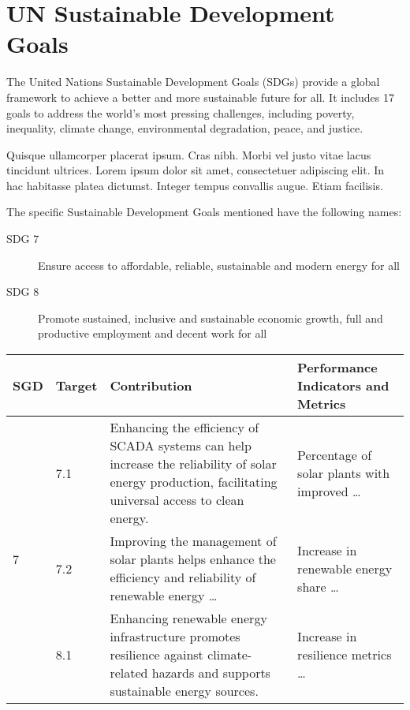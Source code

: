 
\chapter*{UN Sustainable Development Goals} \label{chap:UnitedNations}

The United Nations Sustainable Development Goals (SDGs) provide a global framework to achieve a better and more sustainable future for all. 
It includes 17 goals to address the world's most pressing challenges, including poverty, inequality, climate change, environmental degradation, peace, and justice. 

Quisque ullamcorper placerat ipsum. Cras nibh. Morbi vel justo vitae lacus tincidunt ultrices.
Lorem ipsum dolor sit amet, consectetuer adipiscing elit. 
In hac habitasse platea dictumst. Integer tempus convallis augue. Etiam facilisis. 

The specific Sustainable Development Goals mentioned have the following names:

\begin{description}
\item [SDG 7]
Ensure access to affordable, reliable, sustainable and modern energy for all
\item [SDG 8]
Promote sustained, inclusive and sustainable economic growth, full and productive employment and decent work for all
\end{description}

\begin{center}
\begin{tabular}{|l|l|p{58mm}|p{52mm}|}
\hline
\textbf{SGD} & \textbf{Target} & \textbf{Contribution} & \textbf{Performance Indicators and Metrics} \\ 
\hline
\hline
    \multirow{3}{*}{7} & 7.1 & Enhancing the efficiency of SCADA systems can help increase the reliability of solar energy production, facilitating universal access to clean energy. & Percentage of solar plants with improved \ldots \\
    \cline{2-4}
    & 7.2 & Improving the management of solar plants helps enhance the efficiency and reliability of renewable energy \ldots & Increase in renewable energy share \ldots \\
\hline
    \multirow{2}{*}{8} & 8.1 & Enhancing renewable energy infrastructure promotes resilience against climate-related hazards and supports sustainable energy sources. & Increase in resilience metrics \ldots \\
\hline
\end{tabular}
\end{center}